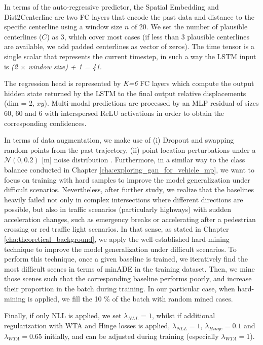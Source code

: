 In terms of the auto-regressive predictor, the Spatial Embedding and Dist2Centerline are two \ac{FC} layers that encode the past data and distance to the specific centerline using a window size $n$ of 20. We set the number of plausible centerlines ($C$) as 3, which cover most cases (if less than $3$ plausible centerlines are available, we add padded centerlines as vector of zeros). The time tensor is a single scalar that represents the current timestep, in such a way the \ac{LSTM} input is \textit{(2 $\times$ window size) + 1 = 41}. 

The regression head is represented by \textit{K=6} \ac{FC} layers which compute the output hidden state returned by the \ac{LSTM} to the final output relative displacements (dim = 2, $xy$). Multi-modal predictions are processed by an \ac{MLP} residual of sizes 60, 60 and 6 with interspersed ReLU activations in order to obtain the corresponding confidences.

In terms of data augmentation, we make use of (i) Dropout and swapping random points from the past trajectory, (ii) point location perturbations under a $\mathcal{N}(0, 0.2)$ [m] noise distribution \cite{ye2021tpcn}. Furthermore, in a similar way to the class balance conducted in Chapter \ref{cha:exploring_gan_for_vehicle_mp}, we want to focus on training with hard samples to improve the model generalization under difficult scenarios. Nevertheless, after further study, we realize that the baselines heavily failed not only in complex intersections where different directions are possible, but also in traffic scenarios (particularly highways) with sudden acceleration changes, such as emergency breaks or accelerating after a pedestrian crossing or red traffic light scenarios. In that sense, as stated in Chapter \ref{cha:theoretical_background}, we apply the well-established hard-mining technique to improve the model generalization under difficult scenarios. To perform this technique, once a given baseline is trained, we iteratively find the most difficult scenes in terms of \ac{minADE} in the training dataset. Then, we mine those scenes such that the corresponding baseline performs poorly, and increase their proportion in the batch during training. In our particular case, when hard-mining is applied, we fill the 10 \% of the batch with random mined cases.

Finally, if only \ac{NLL} is applied, we set $\lambda_{NLL}=1$, whilst if additional regularization with \ac{WTA} and Hinge losses is applied, $\lambda_{NLL}=1$, $\lambda_{Hinge}=0.1$ and $\lambda_{WTA}=0.65$ initially, and can be adjusted during training (especially $\lambda_{WTA}=1$).

